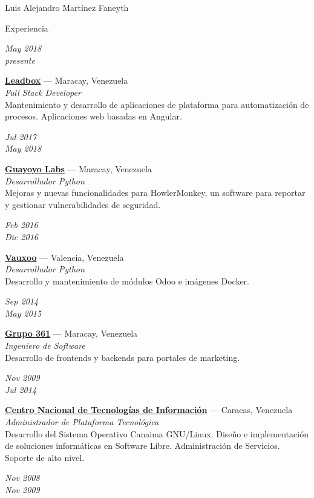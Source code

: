 \documentclass[10pt,letterpaper]{article}
\begin{document}
\begin{cv}{Luis Alejandro Mart\'inez Faneyth}
\begin{cvlist}{Experiencia}
\item[{\parbox[t]{6em}{\textit{\large{May 2018\\presente}}}}]{
	\parbox[t]{\linewidth}{
		\textbf{\href{http://leadboxhq.com}{Leadbox}} --- Maracay, Venezuela\\
		\textit{Full Stack Developer}\\
		\footnotesize{Mantenimiento y desarrollo de aplicaciones de plataforma para automatización de procesos. Aplicaciones web basadas en Angular.}
	}
}
\item[{\parbox[t]{6em}{\textit{\large{Jul 2017\\May 2018}}}}]{
	\parbox[t]{\linewidth}{
		\textbf{\href{https://guayoyolabs.com}{Guayoyo Labs}} --- Maracay, Venezuela\\
		\textit{Desarrollador Python}\\
		\footnotesize{Mejoras y nuevas funcionalidades para HowlerMonkey, un software para reportar y gestionar vulnerabilidades de seguridad.}
	}
}
\item[{\parbox[t]{6em}{\textit{\large{Feb 2016\\Dic 2016}}}}]{
	\parbox[t]{\linewidth}{
		\textbf{\href{https://www.vauxoo.com}{Vauxoo}} --- Valencia, Venezuela\\
		\textit{Desarrollador Python}\\
		\footnotesize{Desarrollo y mantenimiento de m\'odulos Odoo e im\'agenes Docker.}
	}
}
\item[{\parbox[t]{6em}{\textit{\large{Sep 2014\\May 2015}}}}]{
	\parbox[t]{\linewidth}{
		\textbf{\href{http://www.grupo361.com}{Grupo 361}} --- Maracay, Venezuela\\
		\textit{Ingeniero de Software}\\
		\footnotesize{Desarrollo de frontends y backends para portales de marketing.}
	}
}
\item[{\parbox[t]{6em}{\textit{\large{Nov 2009\\Jul 2014}}}}]{
	\parbox[t]{\linewidth}{
		\textbf{\href{https://www.cnti.gob.ve}{Centro Nacional de Tecnolog\'ias de Informaci\'on}} --- Caracas, Venezuela\\
		\textit{Administrador de Plataforma Tecnol\'ogica}\\
		\footnotesize{Desarrollo del Sistema Operativo Canaima GNU/Linux. Dise\~no e implementaci\'on de soluciones inform\'aticas en Software Libre. Administraci\'on de Servicios. Soporte de alto nivel.}
	}
}
\item[{\parbox[t]{6em}{\textit{\large{Nov 2008\\Nov 2009}}}}]{
}
\end{cvlist}
\end{cv}
\end{document}
